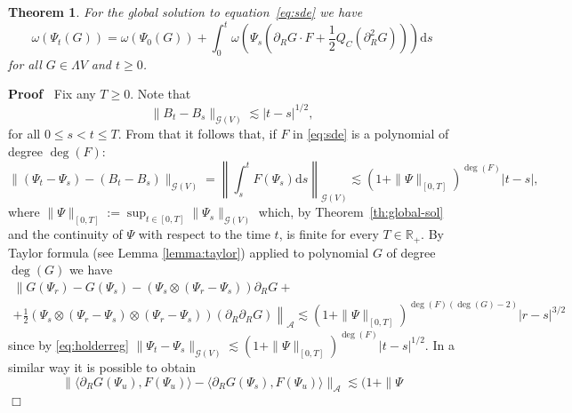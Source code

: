 \documentclass{article}
\newcommand{\assign}{:=}
\newcommand{\mathd}{\mathrm{d}}
\newcommand{\nobracket}{}
\newenvironment{proof}{\noindent\textbf{Proof\ }}{\hspace*{\fill}$\Box$\medskip}
\newtheorem{theorem}{Theorem}
\begin{document}
\begin{theorem}
  For the global solution to equation~{\eqref{eq:sde}} we have
  \begin{equation}
    \omega (\Psi_t (G)) = \omega (\Psi_0 (G)) + \int_0^t \omega \left( \Psi_s
    \left( \partial_R G \cdot F + \frac{1}{2} Q_C (\partial_R^2 G) \right)
    \right) \mathd s \label{eq:ito-3}
  \end{equation}
  for all $G \in \Lambda V$ and $t \geqslant 0$.
\end{theorem}

\begin{proof}
  Fix any $T \geqslant 0$. Note that
  \[ \| B_t - B_s \|_{\mathcal{G} (V)} \lesssim | t - s |^{1 / 2}, \]
  for all $0 \leqslant s < t \leqslant T$. From that it follows that, if $F$
  in {\eqref{eq:sde}} is a polynomial of degree $\deg (F)$:
  \begin{equation}
    \| (\Psi_t - \Psi_s) - (B_t - B_s) \|_{\mathcal{G} (V)} = \left\| \int_s^t
    F (\Psi_s) \mathd s \right\|_{\mathcal{G} (V)} \lesssim (1 + \| \Psi
    \|_{[0, T]})^{\deg (F)} | t - s |, \label{eq:holderreg}
  \end{equation}
  where $\| \Psi \|_{[0, T]} \assign \sup_{t \in [0, T]} \| \Psi_s
  \|_{\mathcal{G} (V)}$ which, by Theorem~\ref{th:global-sol} and the
  continuity of $\Psi$ with respect to the time $t$, is finite for every $T
  \in \mathbb{R}_+$. By Taylor formula (see Lemma \ref{lemma:taylor}) applied
  to polynomial $G$ of degree $\deg (G)$ we have
  \begin{equation}
    \begin{array}{c}
      \nobracket \| G (\Psi_r) - G (\Psi_s) - (\Psi_s \otimes (\Psi_r -
      \Psi_s)) \partial_R G + \nobracket \nobracket\\
      \left. \left. + \frac{1}{2} (\Psi_s \otimes (\Psi_r - \Psi_s) \otimes
      (\Psi_r - \Psi_s)) (\partial_R \partial_R G) \right\|
      \right._{\mathcal{A}} \lesssim (1 + \| \Psi \|_{[0, T]})^{\deg (F) (\deg
      (G) - 2)} | r - s |^{3 / 2}
    \end{array} \label{eq:holderreg2}
  \end{equation}
  since by {\eqref{eq:holderreg}} $\| \Psi_t - \Psi_s \|_{\mathcal{G} (V)}
  \lesssim (1 + \| \Psi \|_{[0, T]})^{\deg (F)} | t - s |^{1 / 2}$. In a
  similar way it is possible to obtain
  \begin{equation}
    \| \langle \partial_R G (\Psi_u), F (\Psi_u) \rangle - \langle \partial_R
    G (\Psi_s), F (\Psi_u) \rangle \|_{\mathcal{A}} \lesssim (1 + \| \Psi

\end{equation}
\end{proof}
\end{document}

